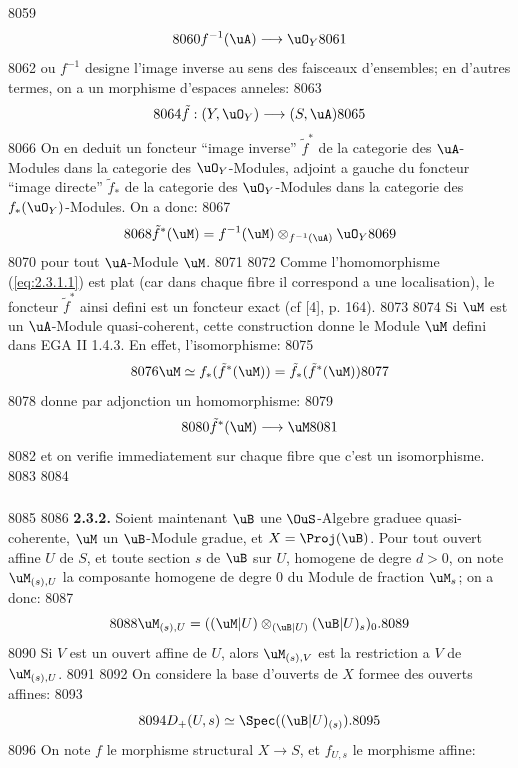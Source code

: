   8059	\begin{equation}\label{eq:2.3.1.1}
  8060	f^{-1}(\uA) \longrightarrow \uO_Y
  8061	\end{equation}
  8062	ou $f^{-1}$ designe l'image inverse au sens des faisceaux d'ensembles; en d'autres termes, on a un morphisme d'espaces anneles:
  8063	\begin{equation}\label{eq:2.3.1.2}
  8064	\tilde{f} : (Y, \uO_Y) \longrightarrow (S, \uA)
  8065	\end{equation}
  8066	On en deduit un foncteur ``image inverse'' $\tilde{f}^*$ de la categorie des $\uA$-Modules dans la categorie des $\uO_Y$-Modules, adjoint a gauche du foncteur ``image directe'' $\tilde{f}_*$ de la categorie des $\uO_Y$-Modules dans la categorie des $f_*(\uO_Y)$-Modules. On a donc:
  8067	\begin{equation}\label{eq:2.3.1.3}
  8068	\tilde{f}^*(\uM) = f^{-1}(\uM) \otimes_{f^{-1}(\uA)} \uO_Y
  8069	\end{equation}
  8070	pour tout $\uA$-Module $\uM$.
  8071	
  8072	Comme l'homomorphisme (\ref{eq:2.3.1.1}) est plat (car dans chaque fibre il correspond a une localisation), le foncteur $\tilde{f}^*$ ainsi defini est un foncteur exact (cf [4], p. 164).
  8073	
  8074	Si $\uM$ est un $\uA$-Module quasi-coherent, cette construction donne le Module $\uM$ defini dans EGA II 1.4.3. En effet, l'isomorphisme:
  8075	\[
  8076	\uM \simeq f_*(\tilde{f}^*(\uM)) = \tilde{f}_*(\tilde{f}^*(\uM))
  8077	\]
  8078	donne par adjonction un homomorphisme:
  8079	\[
  8080	\tilde{f}^*(\uM) \longrightarrow \uM
  8081	\]
  8082	et on verifie immediatement sur chaque fibre que c'est un isomorphisme.
  8083	
  8084	\subsubsection{}
  8085	
  8086	\textbf{2.3.2.} Soient maintenant $\uB$ une $\OuS$-Algebre graduee quasi-coherente, $\uM$ un $\uB$-Module gradue, et $X = \Proj(\uB)$. Pour tout ouvert affine $U$ de $S$, et toute section $s$ de $\uB$ sur $U$, homogene de degre $d > 0$, on note $\uM_{(s),U}$ la composante homogene de degre $0$ du Module de fraction $\uM_s$; on a donc:
  8087	\[
  8088	\uM_{(s),U} = ((\uM|U) \otimes_{(\uB|U)} (\uB|U)_s)_0.
  8089	\]
  8090	Si $V$ est un ouvert affine de $U$, alors $\uM_{(s),V}$ est la restriction a $V$ de $\uM_{(s),U}$.
  8091	
  8092	On considere la base d'ouverts de $X$ formee des ouverts affines:
  8093	\[
  8094	D_+(U,s) \simeq \Spec((\uB|U)_{(s)}).
  8095	\]
  8096	On note $f$ le morphisme structural $X \longrightarrow S$, et $f_{U,s}$ le morphisme affine:

